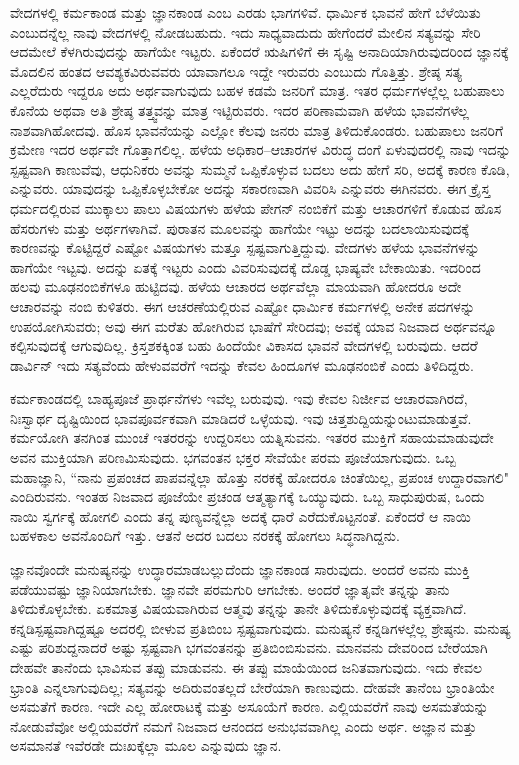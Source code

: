 ವೇದಗಳಲ್ಲಿ ಕರ್ಮಕಾಂಡ ಮತ್ತು ಜ್ಞಾನಕಾಂಡ ಎಂಬ ಎರಡು ಭಾಗಗಳಿವೆ. ಧಾರ್ಮಿಕ ಭಾವನೆ ಹೇಗೆ ಬೆಳೆಯಿತು ಎಂಬುದನ್ನೆಲ್ಲ ನಾವು ವೇದಗಳಲ್ಲಿ ನೋಡಬಹುದು. ಇದು ಸಾಧ್ಯವಾದುದು ಹೇಗೆಂದರೆ ಮೇಲಿನ ಸತ್ಯವನ್ನು ಸೇರಿ ಆದಮೇಲೆ ಕೆಳಗಿರುವುದನ್ನು ಹಾಗೆಯೇ ಇಟ್ಟರು. ಏಕೆಂದರೆ ಋಷಿಗಳಿಗೆ ಈ ಸೃಷ್ಟಿ ಅನಾದಿಯಾಗಿರುವುದರಿಂದ ಜ್ಞಾನಕ್ಕೆ ಮೊದಲಿನ ಹಂತದ ಆವಶ್ಯಕವಿರುವವರು ಯಾವಾಗಲೂ ಇದ್ದೇ ಇರುವರು ಎಂಬುದು ಗೊತ್ತಿತ್ತು. ಶ್ರೇಷ್ಠ ಸತ್ಯ ಎಲ್ಲರೆದುರು ಇದ್ದರೂ ಅದು ಅರ್ಥವಾಗುವುದು ಬಹಳ ಕಡಮೆ ಜನರಿಗೆ ಮಾತ್ರ. ಇತರ ಧರ್ಮಗಳಲ್ಲೆಲ್ಲ ಬಹುಪಾಲು ಕೊನೆಯ ಅಥವಾ ಅತಿ ಶ್ರೇಷ್ಠ ತತ್ತ್ವವನ್ನು ಮಾತ್ರ ಇಟ್ಟಿರುವರು. ಇದರ ಪರಿಣಾಮವಾಗಿ ಹಳೆಯ ಭಾವನೆಗಳೆಲ್ಲ ನಾಶವಾಗಿಹೋದವು. ಹೊಸ ಭಾವನೆಯನ್ನು ಎಲ್ಲೋ ಕೆಲವು ಜನರು ಮಾತ್ರ ತಿಳಿದುಕೊಂಡರು. ಬಹುಪಾಲು ಜನರಿಗೆ ಕ್ರಮೇಣ ಇದರ ಅರ್ಥವೇ ಗೊತ್ತಾಗಲಿಲ್ಲ. ಹಳೆಯ ಅಧಿಕಾರ–ಆಚಾರಗಳ ವಿರುದ್ಧ ದಂಗೆ ಏಳುವುದರಲ್ಲಿ ನಾವು ಇದನ್ನು ಸ್ಪಷ್ಟವಾಗಿ ಕಾಣುವೆವು, ಆಧುನಿಕರು ಅವನ್ನು ಸುಮ್ಮನೆ ಒಪ್ಪಿಕೊಳ್ಳುವ ಬದಲು ಅದು ಹೇಗೆ ಸರಿ, ಅದಕ್ಕೆ ಕಾರಣ ಕೊಡಿ, ಎನ್ನುವರು. ಯಾವುದನ್ನು ಒಪ್ಪಿಕೊಳ್ಳಬೇಕೋ ಅದನ್ನು ಸಕಾರಣವಾಗಿ ವಿವರಿಸಿ ಎನ್ನುವರು ಈಗಿನವರು. ಈಗ ಕ್ರೈಸ್ತ ಧರ್ಮದಲ್ಲಿರುವ ಮುಕ್ಕಾಲು ಪಾಲು ವಿಷಯಗಳು ಹಳೆಯ ಪೇಗನ್ ನಂಬಿಕೆಗೆ ಮತ್ತು ಆಚಾರಗಳಿಗೆ ಕೊಡುವ ಹೊಸ ಹೆಸರುಗಳು ಮತ್ತು ಅರ್ಥಗಳಾಗಿವೆ. ಪುರಾತನ ಮೂಲವನ್ನು ಹಾಗೆಯೇ ಇಟ್ಟು ಅದನ್ನು ಬದಲಾಯಿಸುವುದಕ್ಕೆ ಕಾರಣವನ್ನು ಕೊಟ್ಟಿದ್ದರೆ ಎಷ್ಟೋ ವಿಷಯಗಳು ಮತ್ತೂ ಸ್ಪಷ್ಟವಾಗುತ್ತಿದ್ದುವು. ವೇದಗಳು ಹಳೆಯ ಭಾವನೆಗಳನ್ನು ಹಾಗೆಯೇ ಇಟ್ಟವು. ಅದನ್ನು ಏತಕ್ಕೆ ಇಟ್ಟರು ಎಂದು ವಿವರಿಸುವುದಕ್ಕೆ ದೊಡ್ಡ ಭಾಷ್ಯವೇ ಬೇಕಾಯಿತು. ಇದರಿಂದ ಹಲವು ಮೂಢನಂಬಿಕೆಗಳೂ ಹುಟ್ಟಿದವು. ಹಳೆಯ ಆಚಾರದ ಅರ್ಥವೆಲ್ಲಾ ಮಾಯವಾಗಿ ಹೋದರೂ ಅದೇ ಆಚಾರವನ್ನು ನಂಬಿ ಕುಳಿತರು. ಈಗ ಆಚರಣೆಯಲ್ಲಿರುವ ಎಷ್ಟೋ ಧಾರ್ಮಿಕ ಕರ್ಮಗಳಲ್ಲಿ ಅನೇಕ ಪದಗಳನ್ನು ಉಪಯೋಗಿಸುವರು; ಅವು ಈಗ ಮರೆತು ಹೋಗಿರುವ ಭಾಷೆಗೆ ಸೇರಿದವು; ಅವಕ್ಕೆ ಯಾವ ನಿಜವಾದ ಅರ್ಥವನ್ನೂ ಕಲ್ಪಿಸುವುದಕ್ಕೆ ಆಗುವುದಿಲ್ಲ. ಕ್ರಿಸ್ತಶಕಕ್ಕಿಂತ ಬಹು ಹಿಂದೆಯೇ ವಿಕಾಸದ ಭಾವನೆ ವೇದಗಳಲ್ಲಿ ಬರುವುದು. ಆದರೆ ಡಾರ್ವಿನ್ ಇದು ಸತ್ಯವೆಂದು ಹೇಳುವವರೆಗೆ ಇದನ್ನು ಕೇವಲ ಹಿಂದೂಗಳ ಮೂಢನಂಬಿಕೆ ಎಂದು ತಿಳಿದಿದ್ದರು.

ಕರ್ಮಕಾಂಡದಲ್ಲಿ ಬಾಹ್ಯಪೂಜೆ ಪ್ರಾರ್ಥನೆಗಳು ಇವೆಲ್ಲ ಬರುವುವು. ಇವು ಕೇವಲ ನಿರ್ಜೀವ ಆಚಾರವಾಗಿರದೆ, ನಿಃಸ್ವಾರ್ಥ ದೃಷ್ಟಿಯಿಂದ ಭಾವಪೂರ್ವಕವಾಗಿ ಮಾಡಿದರೆ ಒಳ್ಳೆಯವು. ಇವು ಚಿತ್ತಶುದ್ದಿಯನ್ನುಂಟುಮಾಡುತ್ತವೆ. ಕರ್ಮಯೋಗಿ ತನಗಿಂತ ಮುಂಚೆ ಇತರರನ್ನು ಉದ್ದರಿಸಲು ಯತ್ನಿಸುವನು. ಇತರರ ಮುಕ್ತಿಗೆ ಸಹಾಯಮಾಡುವುದೇ ಅವನ ಮುಕ್ತಿಯಾಗಿ ಪರಿಣಮಿಸುವುದು. ಭಗವಂತನ ಭಕ್ತರ ಸೇವೆಯೇ ಪರಮ ಪೂಜೆಯಾಗುವುದು. ಒಬ್ಬ ಮಹಾಜ್ಞಾನಿ, “ನಾನು ಪ್ರಪಂಚದ ಪಾಪವನ್ನೆಲ್ಲಾ ಹೊತ್ತು ನರಕಕ್ಕೆ ಹೋದರೂ ಚಿಂತೆಯಿಲ್ಲ, ಪ್ರಪಂಚ ಉದ್ದಾರವಾಗಲಿ" ಎಂದಿರುವನು. ಇಂತಹ ನಿಜವಾದ ಪೂಜೆಯೇ ಪ್ರಚಂಡ ಆತ್ಮತ್ಯಾಗಕ್ಕೆ ಒಯ್ಯುವುದು. ಒಬ್ಬ ಸಾಧುಪುರುಷ, ಒಂದು ನಾಯಿ ಸ್ವರ್ಗಕ್ಕೆ ಹೋಗಲಿ ಎಂದು ತನ್ನ ಪುಣ್ಯವನ್ನೆಲ್ಲಾ ಅದಕ್ಕೆ ಧಾರೆ ಎರೆದುಕೊಟ್ಟನಂತೆ. ಏಕೆಂದರೆ ಆ ನಾಯಿ ಬಹಳಕಾಲ ಅವನೊಂದಿಗೆ ಇತ್ತು. ಆತನೆ ಅದರ ಬದಲು ನರಕಕ್ಕೆ ಹೋಗಲು ಸಿದ್ಧನಾಗಿದ್ದನು.

ಜ್ಞಾನವೊಂದೇ ಮನುಷ್ಯನನ್ನು ಉದ್ಧಾರಮಾಡಬಲ್ಲುದೆಂದು ಜ್ಞಾನಕಾಂಡ ಸಾರುವುದು. ಅಂದರೆ ಅವನು ಮುಕ್ತಿ ಪಡೆಯುವಷ್ಟು ಜ್ಞಾನಿಯಾಗಬೇಕು. ಜ್ಞಾನವೇ ಪರಮಗುರಿ ಆಗಬೇಕು. ಅಂದರೆ ಜ್ಞಾತೃವೇ ತನ್ನನ್ನು ತಾನು ತಿಳಿದುಕೊಳ್ಳಬೇಕು. ಏಕಮಾತ್ರ ವಿಷಯವಾಗಿರುವ ಆತ್ಮವು ತನ್ನನ್ನು ತಾನೇ ತಿಳಿದುಕೊಳ್ಳುವುದಕ್ಕೆ ವ್ಯಕ್ತವಾಗಿದೆ. ಕನ್ನಡಿ\break ಸ್ಪಷ್ಟವಾಗಿದ್ದಷ್ಟೂ ಅದರಲ್ಲಿ ಬೀಳುವ ಪ್ರತಿಬಿಂಬ ಸ್ಪಷ್ಟವಾಗುವುದು. ಮನುಷ್ಯನೆ ಕನ್ನಡಿಗಳಲ್ಲೆಲ್ಲ ಶ್ರೇಷ್ಠನು. ಮನುಷ್ಯ ಎಷ್ಟು ಪರಿಶುದ್ದನಾದರೆ ಅಷ್ಟು ಸ್ಪಷ್ಟವಾಗಿ ಭಗವಂತನನ್ನು ಪ್ರತಿಬಿಂಬಿಸುವನು. ಮಾನವನು ದೇವರಿಂದ ಬೇರೆಯಾಗಿ ದೇಹವೇ ತಾನೆಂದು ಭಾವಿಸುವ ತಪ್ಪು ಮಾಡುವನು. ಈ ತಪ್ಪು ಮಾಯೆಯಿಂದ ಜನಿತವಾಗುವುದು. ಇದು ಕೇವಲ ಭ್ರಾಂತಿ ಎನ್ನಲಾಗುವುದಿಲ್ಲ; ಸತ್ಯವನ್ನು ಅದಿರುವಂತಲ್ಲದೆ ಬೇರೆಯಾಗಿ ಕಾಣುವುದು. ದೇಹವೇ ತಾನೆಂಬ ಭ್ರಾಂತಿಯೇ ಅಸಮತೆಗೆ ಕಾರಣ. ಇದೇ ಎಲ್ಲ ಹೋರಾಟಕ್ಕೆ ಮತ್ತು ಅಸೂಯೆಗೆ ಕಾರಣ. ಎಲ್ಲಿಯವರೆಗೆ ನಾವು ಅಸಮತೆಯನ್ನು ನೋಡುವೆವೋ ಅಲ್ಲಿಯವರೆಗೆ ನಮಗೆ ನಿಜವಾದ ಆನಂದದ ಅನುಭವವಾಗಿಲ್ಲ ಎಂದು ಅರ್ಥ. ಅಜ್ಞಾನ ಮತ್ತು ಅಸಮಾನತೆ ಇವೆರಡೇ ದುಃಖಕ್ಕೆಲ್ಲಾ ಮೂಲ ಎನ್ನುವುದು ಜ್ಞಾನ.

